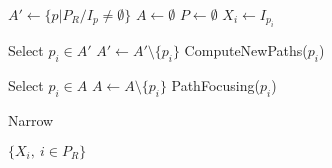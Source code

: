 \STATE $A' \gets \{p | P_R / I_p \neq \emptyset\}$
\STATE $A \gets \emptyset$
\STATE $P \gets \emptyset$ 
	\STATE $X_i \gets I_{p_i}$ \label{alg=X-init}
\ENDFOR 
{}

 \label{alg=start-add-paths} 
	\STATE Select $p_i \in A'$
	\STATE $A' \gets A' \setminus \{p_i\}$
	\STATE ComputeNewPaths($p_i$) \label{alg=computeNewPaths}
\ENDWHILE \label{alg=end-add-paths}

\STATE {}
 \label{alg=start-ascending} 
	\STATE Select $p_i \in A$
	\STATE $A \gets A \setminus \{p_i\}$
	\STATE PathFocusing($p_i$) 
	
\ENDWHILE \label{alg=end-ascending}
\STATE Narrow \label{alg=narrowing}
\ENDWHILE

\RETURN $\{X_i,\ i \in P_R\}$

